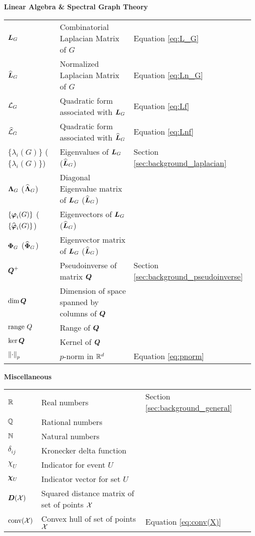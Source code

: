 \noindent \textbf{Linear Algebra \& Spectral Graph Theory}\\ 
\vspace{\headingsep} 
\begin{longtable}{p{\colwidth}p{\descsep}l}
	{$\vb*{L}_G$} & {Combinatorial Laplacian Matrix of $G$} & Equation \eqref{eq:L_G}\\
	{$\widehat{\vb*{L}}_G$} & {Normalized Laplacian Matrix of $G$} & Equation \eqref{eq:Ln_G}\\
	{$\mathcal{L}_G$} & Quadratic form associated with $\vb*{L}_G$  & Equation \eqref{eq:Lf}\\
	{$\widehat{\mathcal{L}}_G$} & Quadratic form associated with $\widehat{\vb*{L}}_G$ & Equation \eqref{eq:Lnf}\\
	$\{\lambda_i(G)\}$ ($\{\lambda_i(G)\}$) & Eigenvalues of $\vb*{L}_G$ ($\widehat{\vb*{L}}_G$) & Section \ref{sec:background_laplacian}\\
	$\vb{\Lambda}_G$ ($\widehat{\vb{\Lambda}}_G$) & Diagonal Eigenvalue matrix of $\vb*{L}_G$ ($\widehat{\vb*{L}}_G$) \\
	$\{\vb*{\varphi}_i(G)\}$ ($\{\widehat{\vb*{\varphi}}_i(G)\}$) & Eigenvectors of $\vb*{L}_G$ ($\widehat{\vb*{L}}_G$)\\
	{$\boldsymbol{\Phi}_G$ ($\widehat{\boldsymbol{\Phi}}_G$)} & Eigenvector matrix of $\vb*{L}_G$ ($\widehat{\vb*{L}}_G$)\\
	$\vb*{Q}^+$ & Pseudoinverse of matrix $\vb*{Q}$  & Section \ref{sec:background_pseudoinverse}\\
	$\dim \vb*{Q}$ & Dimension of space spanned by columns of $\vb*{Q}$ \\
	$\range\ Q$ & Range of $\vb*{Q}$ \\
	$\ker\vb*{Q}$ & Kernel of $\vb*{Q}$\\
	$\norm{\cdot}_p$ & $p$-norm in $\mathbb{R}^d$ & Equation \eqref{eq:pnorm}
\end{longtable}
\vspace{\groupsep}

\noindent \textbf{Miscellaneous}\\ 
\vspace{\headingsep} 
\begin{longtable}{p{\colwidth}p{\descsep}l}
	$\mathbb{R}$ & Real numbers &Section \ref{sec:background_general} \\
	$\mathbb{Q}$ & Rational numbers\\
	$\mathbb{N}$ & Natural numbers\\
	$\delta_{ij}$ & Kronecker delta function \\
	$\chi_U$ & Indicator for event $U$\\
	$\boldsymbol{\chi}_U$ & Indicator vector for set $U$ \\	
	$\vb*{D}(\mathcal{X})$ & Squared distance matrix of set of points $\mathcal{X}$ &  \\
		$\textnormal{conv}(\mathcal{X})$ & Convex hull of set of points $\mathcal{X}$ & Equation \eqref{eq:conv(X)}\\
\end{longtable}
